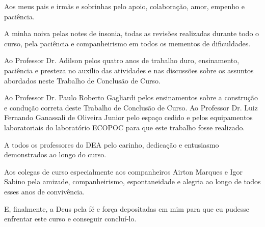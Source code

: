 \begin{agradecimentos}

Aos meus pais e irmãs e sobrinhas pelo apoio, colaboração, amor, empenho e paciência.

A minha noiva pelas notes de insonia, todas as revisões realizadas durante todo o curso, pela paciência e companheirismo em todos os mementos de dificuldades.

Ao Professor Dr. Adilson pelos quatro anos de trabalho duro, ensinamento, paciência e presteza no auxílio das atividades e nas discussões sobre os assuntos abordados neste Trabalho de Conclusão de Curso. 

Ao Professor Dr. Paulo Roberto Gagliardi pelos ensinamentos sobre a construção e condução correta deste Trabalho de Conclusão de Curso.
Ao Professor Dr. Luiz Fernando Ganassali de Oliveira Junior pelo espaço cedido e pelos equipamentos laboratoriais do laboratório ECOPOC para que este trabalho fosse realizado.

A todos os professores do DEA pelo carinho, dedicação e entusiasmo demonstrados ao longo do curso. 

Aos colegas de curso especialmente aos companheiros Airton Marques e Igor Sabino pela amizade, companheirismo,  espontaneidade e alegria ao longo de todos esses anos de convivência.

E, finalmente, a Deus pela fé e força depositadas em mim para que eu pudesse enfrentar este curso e conseguir concluí-lo.
\end{agradecimentos}
